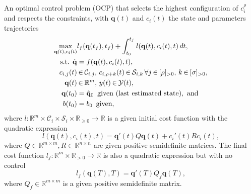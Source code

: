 \documentclass[letterpaper,10pt,journal,twoside]{IEEEtran}
\theoremstyle{definition}
\begin{document}
An optimal control problem (OCP) that selects the highest configuration of {\color{blue} $c_i^\rho$} and respects the constraints, with $\mathbf{q}(t)$ and $c_i(t)$ the state and parameters trajectories
\begin{subequations}\label{eq:ocp-output-mpc}\begin{align}
  \max_{\mathbf{q}(t),c_i(t)}&{l_f(\mathbf{q}(t_f),t_f)+\int_{t_0}^{t_f}{l(\mathbf{q}(t),c_i(t),t)\,dt}},\label{eq:ocp-costs}\\
  \text{s.t. }\dot{\mathbf{q}}&=f(\mathbf{q}(t),c_i(t),t),\label{eq:dyn-evol}\\
  c_{i,j}(t)&\hspace*{-.2ex}\in\hspace*{-.2ex}\mathcal{C}_{i,j},\,c_{i,\rho+k}(t)\hspace*{-.2ex}\in\hspace*{-.2ex}\mathcal{S}_{i,k}\,\forall j\hspace*{-.2ex}\in\hspace*{-.2ex}[\rho]_{>0},\,k\hspace*{-.2ex}\in\hspace*{-.2ex}[\sigma]_{>0},\label{eq:state-cont-const-mpc}\\
  \mathbf{q}(t)&\hspace*{-.2ex}\in\hspace*{-.2ex}\mathbb{R}^m,\,y(t)\hspace*{-.2ex}\in\hspace*{-.2ex}\mathcal{Y}(t),\label{eq:batt-const-mpc}\\
  \mathbf{q}(t_0)&=\hat{\mathbf{q}}_0\,\,\,\text{given (last estimated state)},\text{ and}\label{eq:ocp-outp-mpc-state-est}\\
  b(t_0)&=b_0\,\,\,\text{given}\label{eq:ocp-outp-bat},
\end{align}\end{subequations}
where $l:\mathbb{R}^m\times\mathcal{C}_i\times\mathcal{S}_i\times\mathbb{R}_{\geq 0}\rightarrow\mathbb{R}$ is a given initial cost function with the quadratic expression
\begin{equation}\label{eq:insta-cost-mpc}
  l(\mathbf{q}(t),c_i(t),t)=\mathbf{q}'(t)Q\mathbf{q}(t)+c_i'(t)Rc_i(t),
\end{equation}
where $Q\in\mathbb{R}^{m\times m},R\in\mathbb{R}^{n\times n}$ are given positive semidefinite matrices.%
The final cost function $l_f:\mathbb{R}^m\times\mathbb{R}_{> 0}\rightarrow\mathbb{R}$ is also a quadratic expression but with no control~\cite{rawlings2017model}
\begin{equation}\label{eq:final-cost-mpc}
  l_f(\mathbf{q}(T),T)=\mathbf{q}'(T)Q_f\mathbf{q}(T),
\end{equation}
where $Q_f\in\mathbb{R}^{m\times m}$ is a given positive semidefinite matrix.
\end{document}
